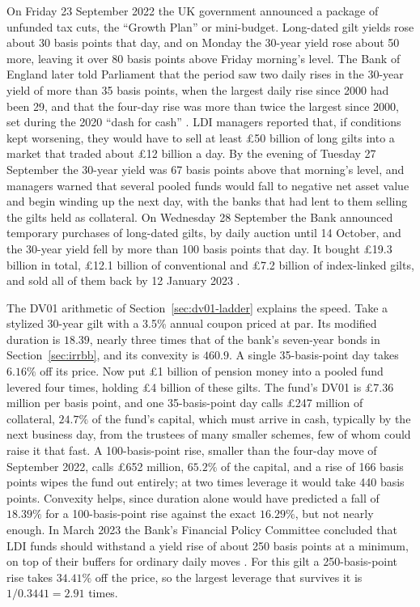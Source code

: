 \documentclass[../ai_in_finance]{subfiles}
\begin{document}
On Friday 23 September 2022 the UK government announced a package of unfunded tax cuts, the ``Growth Plan'' or mini-budget. Long-dated gilt yields rose about 30 basis points that day, and on Monday the 30-year yield rose about 50 more, leaving it over 80 basis points above Friday morning's level. The Bank of England later told Parliament that the period saw two daily rises in the 30-year yield of more than 35 basis points, when the largest daily rise since 2000 had been 29, and that the four-day rise was more than twice the largest since 2000, set during the 2020 ``dash for cash'' \parencite{cunliffe2022ldi}. LDI managers reported that, if conditions kept worsening, they would have to sell at least \pounds50 billion of long gilts into a market that traded about \pounds12 billion a day. By the evening of Tuesday 27 September the 30-year yield was 67 basis points above that morning's level, and managers warned that several pooled funds would fall to negative net asset value and begin winding up the next day, with the banks that had lent to them selling the gilts held as collateral. On Wednesday 28 September the Bank announced temporary purchases of long-dated gilts, by daily auction until 14 October, and the 30-year yield fell by more than 100 basis points that day. It bought \pounds19.3 billion in total, \pounds12.1 billion of conventional and \pounds7.2 billion of index-linked gilts, and sold all of them back by 12 January 2023 \parencite{boe2023unwind}.

The DV01 arithmetic of Section~\ref{sec:dv01-ladder} explains the speed. Take a stylized 30-year gilt with a 3.5\% annual coupon priced at par. Its modified duration is $18.39$, nearly three times that of the bank's seven-year bonds in Section~\ref{sec:irrbb}, and its convexity is $460.9$. A single 35-basis-point day takes $6.16\%$ off its price. Now put \pounds1 billion of pension money into a pooled fund levered four times, holding \pounds4 billion of these gilts. The fund's DV01 is \pounds7.36 million per basis point, and one 35-basis-point day calls \pounds247 million of collateral, $24.7\%$ of the fund's capital, which must arrive in cash, typically by the next business day, from the trustees of many smaller schemes, few of whom could raise it that fast. A 100-basis-point rise, smaller than the four-day move of September 2022, calls \pounds652 million, $65.2\%$ of the capital, and a rise of 166 basis points wipes the fund out entirely; at two times leverage it would take 440 basis points. Convexity helps, since duration alone would have predicted a fall of $18.39\%$ for a 100-basis-point rise against the exact $16.29\%$, but not nearly enough. In March 2023 the Bank's Financial Policy Committee concluded that LDI funds should withstand a yield rise of about 250 basis points at a minimum, on top of their buffers for ordinary daily moves \parencite{fpc2023ldi}. For this gilt a 250-basis-point rise takes $34.41\%$ off the price, so the largest leverage that survives it is $1/0.3441 = 2.91$ times.
\end{document}
